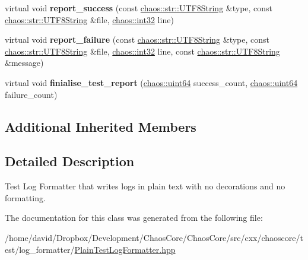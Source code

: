 \begin{DoxyCompactItemize}
\item 
\hypertarget{classchaos_1_1test_1_1log__formatter_1_1_plain_test_log_formatter_a6ff953811ac8bce5b8ac79610bf06424}{virtual void {\bfseries report\-\_\-success} (const \hyperlink{classchaos_1_1str_1_1_u_t_f8_string}{chaos\-::str\-::\-U\-T\-F8\-String} \&type, const \hyperlink{classchaos_1_1str_1_1_u_t_f8_string}{chaos\-::str\-::\-U\-T\-F8\-String} \&file, \hyperlink{namespacechaos_ad1de7efb430365afd2c9446a0f522a90}{chaos\-::int32} line)}\label{classchaos_1_1test_1_1log__formatter_1_1_plain_test_log_formatter_a6ff953811ac8bce5b8ac79610bf06424}

\item 
\hypertarget{classchaos_1_1test_1_1log__formatter_1_1_plain_test_log_formatter_a361fdf2f1108832a0e74b5a311dd00b0}{virtual void {\bfseries report\-\_\-failure} (const \hyperlink{classchaos_1_1str_1_1_u_t_f8_string}{chaos\-::str\-::\-U\-T\-F8\-String} \&type, const \hyperlink{classchaos_1_1str_1_1_u_t_f8_string}{chaos\-::str\-::\-U\-T\-F8\-String} \&file, \hyperlink{namespacechaos_ad1de7efb430365afd2c9446a0f522a90}{chaos\-::int32} line, const \hyperlink{classchaos_1_1str_1_1_u_t_f8_string}{chaos\-::str\-::\-U\-T\-F8\-String} \&message)}\label{classchaos_1_1test_1_1log__formatter_1_1_plain_test_log_formatter_a361fdf2f1108832a0e74b5a311dd00b0}

\item 
\hypertarget{classchaos_1_1test_1_1log__formatter_1_1_plain_test_log_formatter_a0c2345aad1560f9df8613f8a1ae7d919}{virtual void {\bfseries finialise\-\_\-test\-\_\-report} (\hyperlink{namespacechaos_a34fe5f5bfc3ef6d80b5d094ed91b4d6e}{chaos\-::uint64} success\-\_\-count, \hyperlink{namespacechaos_a34fe5f5bfc3ef6d80b5d094ed91b4d6e}{chaos\-::uint64} failure\-\_\-count)}\label{classchaos_1_1test_1_1log__formatter_1_1_plain_test_log_formatter_a0c2345aad1560f9df8613f8a1ae7d919}

\end{DoxyCompactItemize}
\subsection*{Additional Inherited Members}


\subsection{Detailed Description}
Test Log Formatter that writes logs in plain text with no decorations and no formatting. 

The documentation for this class was generated from the following file\-:\begin{DoxyCompactItemize}
\item 
/home/david/\-Dropbox/\-Development/\-Chaos\-Core/\-Chaos\-Core/src/cxx/chaoscore/test/log\-\_\-formatter/\hyperlink{_plain_test_log_formatter_8hpp}{Plain\-Test\-Log\-Formatter.\-hpp}\end{DoxyCompactItemize}
